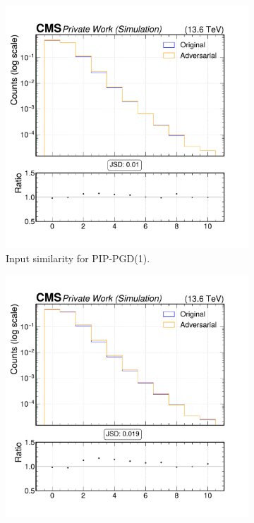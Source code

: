 \begin{figure}[h]
  \centering
  \begin{subfigure}[t]{0.32\textwidth}
    \includegraphics[width=\linewidth]{media/output/features/compare/combined_it_1/cmp_global_features_nsv.pdf}
    \caption*{Input similarity for PIP-PGD(1).}
  \end{subfigure}\hfill
  \begin{subfigure}[t]{0.32\textwidth}
    \includegraphics[width=\linewidth]{media/output/features/compare/combined_it_2/cmp_global_features_nsv.pdf}

\end{subfigure}
\end{figure}
